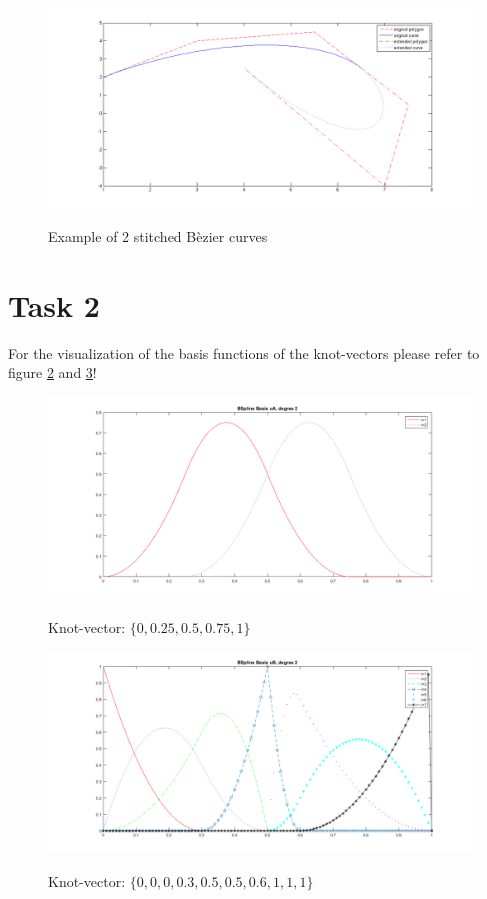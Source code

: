 \documentclass[12pt,a4paper]{article}
\begin{document}
\begin{figure}[hbtp]
\caption{Example of 2 stitched Bèzier curves}
\centering
\includegraphics[width=\textwidth]{newBranch.png}
\label{fig:1}
\end{figure}

\section{Task 2}
For the visualization of the basis functions of the knot-vectors please refer to figure \ref{fig:2a} and \ref{fig:2b}! 

\begin{figure}[hbtp]
\caption{Knot-vector: $\{0, 0.25, 0.5, 0.75, 1\}$}
\centering
\includegraphics[width=\textwidth]{basisFunctA.png}
\label{fig:2a}
\end{figure}

\begin{figure}[hbtp]
\caption{Knot-vector: $\{0, 0, 0, 0.3, 0.5, 0.5, 0.6, 1, 1, 1\}$}
\centering
\includegraphics[width=\textwidth]{basisFunctB.png}
\label{fig:2b}
\end{figure}
\end{document}
